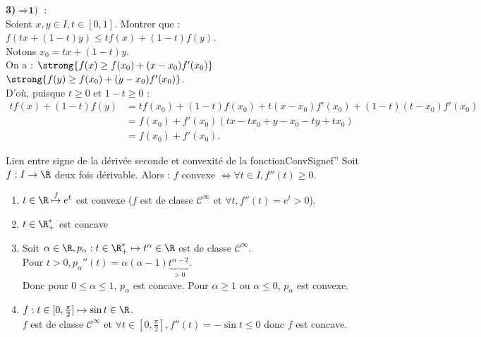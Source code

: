 \documentclass[12pt,a4paper]{report}
\begin{document}
\begin{demo}
\textbf{3)}$\Longrightarrow \textbf{1)}$ : \\
Soient $x,y \in I, t \in [0,1]$. Montrer que : $f(tx+(1-t)y) \le tf(x)+(1-t)f(y)$. \\
Notons $x_0 = tx+(1-t)y$. \\
On a : $\strong{f(x) \ge f(x_0) + (x-x_0)f'(x_0)}$ \\
$\strong{f(y) \ge f(x_0) + (y-x_0)f'(x_0)}$. \\
D'où, puisque $t \ge 0$ et $1-t \ge 0$ : \\
\begin{align*}
tf(x) + (1-t)f(y) &= tf(x_0) + (1-t)f(x_0) + t(x-x_0)f'(x_0) + (1-t)(t-x_0)f'(x_0) \\
&= f(x_0) + f'(x_0)(tx-tx_0 + y -x_0 - ty + tx_0) \\
&= f(x_0) + f'(x_0).
\end{align*}
\end{demo}


\begin{corollaire}{Lien entre signe de la dérivée seconde et convexité de la fonction}{ConvSignef''}
Soit $f : I \to \R$ deux fois dérivable. Alors : $f$ convexe $\Longleftrightarrow \forall t \in I, f''(t) \ge 0$.
\end{corollaire}

\begin{exemple}[Exemples]{}
\begin{enumerate}
	\item $t \in \R \overset{f}{\mapsto} e^t$ est convexe ($f$ est de classe $\mathcal{C}^{\infty}$ et $\forall t, f''(t) = e^t >0$).
	\item $t \in \R_+^*$ est concave \footnotemark
	\item Soit $\alpha \in \R, p_\alpha : t \in \R_+^* \mapsto t^\alpha \in \R$ est de classe $\mathcal{C}^\infty$. \\
		Pour $t >0, p_\alpha''(t) = \alpha(\alpha-1)\underbrace{t^{\alpha-2}}_{>0}$. \\
		Donc pour $0 \le \alpha \le 1$, $p_\alpha$ est concave.
		Pour $\alpha \ge 1$ ou $\alpha \le 0$, $p_{\alpha}$ est convexe.
	\item $f : t \in [0,\frac{\pi}{2}] \mapsto \sin t \in \R$. \\
		$f$ est de classe $\mathcal{C}^\infty$ et $\forall t \in [0,\frac{\pi}{2}], f''(t) = - \sin t \le 0$ donc $f$ est concave.
\end{enumerate}
\end{exemple}
\end{document}
